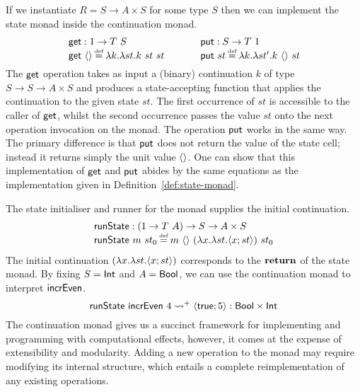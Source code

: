 \documentclass[12pt,phd,lfcs,twoside,openright,logo,leftchapter,normalheadings]{infthesis}
\theoremstyle{plain}
\theoremstyle{definition}
\begin{document}
If we instantiate $R = S \to A \times S$ for some type $S$ then we
can implement the state monad inside the continuation monad.
%
\[
  \ba{@{~}l@{\qquad\quad}@{~}r}
    \multirow{2}{*}{
      \bl
        \getF : \UnitType \to T~S\\
        \getF~\Unit \defas \lambda k.\lambda st.k~st~st
      \el} &
    \multirow{2}{*}{
      \bl
        \putF : S \to T~\UnitType\\
        \putF~st \defas \lambda k.\lambda st'.k~\Unit~st
      \el} \\ & %
  \ea
\]
%
The $\mathsf{get}$ operation takes as input a (binary) continuation $k$ of
type $S \to S \to A \times S$ and produces a state-accepting function
that applies the continuation to the given state $st$. The first
occurrence of $st$ is accessible to the caller of $\mathsf{get}$, whilst the
second occurrence passes the value $st$ onto the next operation
invocation on the monad. The operation $\mathsf{put}$ works in the same
way. The primary difference is that $\mathsf{put}$ does not return the value
of the state cell; instead it returns simply the unit value $\langle  \rangle$.
%
One can show that this implementation of $\mathsf{get}$ and $\mathsf{put}$ abides by
the same equations as the implementation given in
Definition~\ref{def:state-monad}.

The state initialiser and runner for the monad supplies the initial
continuation.
%
\[
  \bl
    \runState : (\UnitType \to T~A) \to S \to A \times S\\
    \runState~m~st_0 \defas m~\Unit~(\lambda x.\lambda st. \Record{x;st})~st_0
  \el
\]
%
The initial continuation $(\lambda x.\lambda st. \langle x;st \rangle)$
corresponds to the $\mathbf{return}$ of the state monad.
%
By fixing $S = \mathsf{Int}$ and $A = \mathsf{Bool}$, we can use the continuation
monad to interpret $\mathsf{incrEven}$.
%
\[
  \mathsf{runState}~\mathsf{incrEven}~4 \leadsto^+ \langle \mathsf{true};5 \rangle : \mathsf{Bool} \times \mathsf{Int}
\]
%
The continuation monad gives us a succinct framework for implementing
and programming with computational effects, however, it comes at the
expense of extensibility and modularity. Adding a new operation to the
monad may require modifying its internal structure, which entails a
complete reimplementation of any existing operations.
\end{document}
